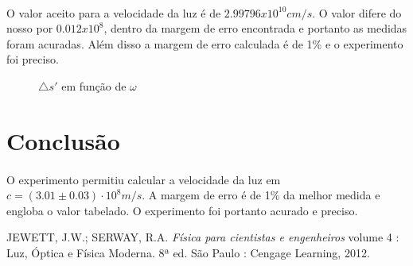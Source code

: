 \documentclass[a4paper,11pt]{article}
\begin{document}
\paragraph{} O valor aceito para a velocidade da luz é de $2.99796x10^{10}cm/s$. O valor 
difere do nosso por $0.012 x 10^{8}$, dentro da margem de erro encontrada e portanto
as medidas foram acuradas. Além disso a margem de erro calculada é de 1\% e o experimento
foi preciso.


\FloatBarrier
\begin{figure}
         
        \caption{$\triangle s'$ em função de $\omega$}
        \label{graph:A}
\end{figure}
\FloatBarrier

\section{Conclusão}
\paragraph{} O experimento permitiu calcular a velocidade da luz em
 $c = (3.01 \pm 0.03)\cdot 10^{8} m/s$. A margem de erro é de 1\% da melhor
 medida e engloba o valor tabelado. O experimento foi portanto acurado e preciso.  





\begin{thebibliography}{9}    
  		JEWETT, J.W.; SERWAY, R.A.
  		\emph{Física para cientistas e engenheiros}
volume 4 : Luz, Óptica e Física Moderna.
 		 8ª ed.
 		 São Paulo : Cengage Learning, 2012.
 		 
\end{thebibliography}
\end{document}
